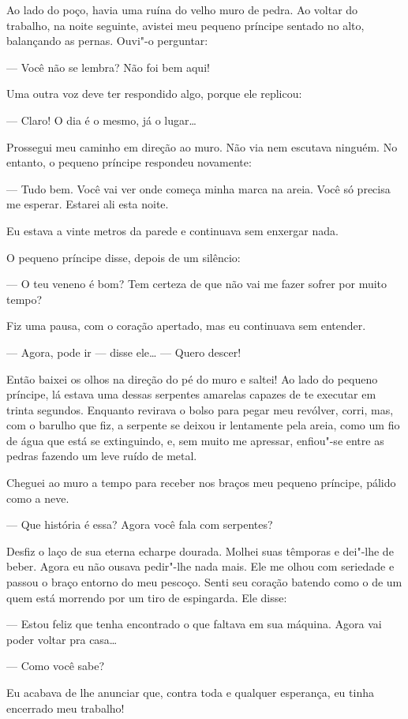 \begin{Parallel}[p]{}{}
{Ao lado do poço, havia uma ruína do velho muro de pedra. Ao voltar do
trabalho, na noite seguinte, avistei meu pequeno príncipe sentado no
alto, balançando as pernas. Ouvi"-o perguntar:

--- Você não se lembra? Não foi bem aqui!

Uma outra voz deve ter respondido algo, porque ele replicou:

--- Claro! O dia é o mesmo, já o lugar\ldots{}

Prossegui meu caminho em direção ao muro. Não via nem escutava ninguém.
No entanto, o pequeno príncipe respondeu novamente:

--- Tudo bem. Você vai ver onde começa minha marca na areia. Você só
precisa me esperar. Estarei ali esta noite.

Eu estava a vinte metros da parede e continuava sem enxergar nada.

O pequeno príncipe disse, depois de um silêncio:

--- O teu veneno é bom? Tem certeza de que não vai me fazer sofrer por
muito tempo?

Fiz uma pausa, com o coração apertado, mas eu continuava sem entender.

--- Agora, pode ir --- disse ele\ldots{} --- Quero descer!

Então baixei os olhos na direção do pé do muro e saltei! Ao lado do
pequeno príncipe, lá estava uma dessas serpentes amarelas capazes de te
executar em trinta segundos. Enquanto revirava o bolso para pegar meu
revólver, corri, mas, com o barulho que fiz, a serpente se deixou ir
lentamente pela areia, como um fio de água que está se extinguindo, e,
sem muito me apressar, enfiou"-se entre as pedras fazendo um leve ruído
de metal.

Cheguei ao muro a tempo para receber nos braços meu pequeno príncipe,
pálido como a neve.

--- Que história é essa? Agora você fala com serpentes?

Desfiz o laço de sua eterna echarpe dourada. Molhei suas têmporas e
dei"-lhe de beber. Agora eu não ousava pedir"-lhe nada mais. Ele me olhou
com seriedade e passou o braço entorno do meu pescoço. Senti seu coração
batendo como o de um quem está morrendo por um tiro de espingarda. Ele
disse:

--- Estou feliz que tenha encontrado o que faltava em sua máquina. Agora
vai poder voltar pra casa\ldots{}

--- Como você sabe?

Eu acabava de lhe anunciar que, contra toda e qualquer esperança, eu
tinha encerrado meu trabalho!

}
\end{Parallel}

